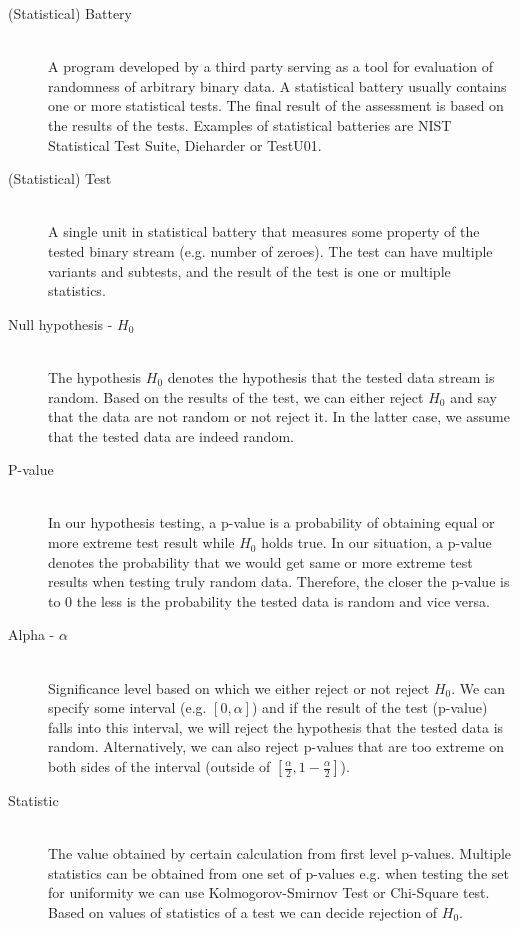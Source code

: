 \documentclass[
  digital,  	%
  color,		%
  oneside,   	%
  12pt,
  nocover,
  notable,
  nolof,
  nolot,
]{fithesis3}
\theoremstyle{definition}
\theoremstyle{remark}
\begin{document}
\begin{description}
\item[(Statistical) Battery] \hfill \\
A program developed by a third party serving as a tool for evaluation of randomness of arbitrary binary data. A statistical battery usually contains one or more statistical tests. The final result of the assessment is based on the results of the tests. Examples of statistical batteries are NIST Statistical Test Suite, Dieharder or TestU01.

\item[(Statistical) Test] \hfill \\
A single unit in statistical battery that measures some property of the tested binary stream (e.g. number of zeroes). The test can have multiple variants and subtests, and the result of the test is one or multiple statistics.

\item[Null hypothesis - $H_0$] \hfill \\
The hypothesis $H_0$ denotes the hypothesis that the tested data stream is random. Based on the results of the test, we can either reject $H_0$ and say that the data are not random or not reject it. In the latter case, we assume that the tested data are indeed random.

\item[P-value] \hfill \\
In our hypothesis testing, a p-value is a probability of obtaining equal or more extreme test result while $H_0$ holds true. In our situation, a p-value denotes the probability that we would get same or more extreme test results when testing truly random data. Therefore, the closer the p-value is to 0 the less is the probability the tested data is random and vice versa.

\item[Alpha - $\alpha$] \hfill \\
Significance level based on which we either reject or not reject $H_0$. We can specify some interval (e.g. $[0,\alpha]$) and if the result of the test (p-value) falls into this interval, we will reject the hypothesis that the tested data is random. Alternatively, we can also reject p-values that are too extreme on both sides of the interval (outside of $\left[\frac{\alpha}{2},1-\frac{\alpha}{2}\right]$).

\item[Statistic] \hfill \\
The value obtained by certain calculation from first level p-values. Multiple statistics can be obtained from one set of p-values e.g. when testing the set for uniformity we can use Kolmogorov-Smirnov Test or Chi-Square test. Based on values of statistics of a test we can decide rejection of $H_0$.


\end{description}
\end{document}
